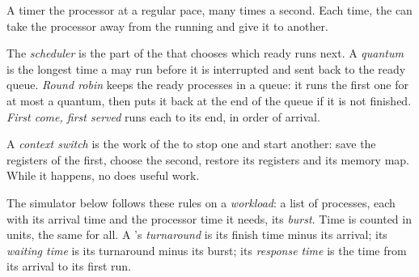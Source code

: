 A timer  the processor at a regular pace, many times a second. Each time, the  can take the processor away from the running  and give it to another.

\begin{definition}\label{def:g12:processes-and-scheduling:scheduler}
The \emph{scheduler} is the part of the  that chooses which ready  runs next. A
\emph{quantum} is the longest time a  may run before it is interrupted and sent back to the
ready queue. \emph{Round robin} keeps the ready processes in a queue: it runs the first one for at
most a quantum, then puts it back at the end of the queue if it is not finished. \emph{First come, first served} runs
each  to its end, in order of arrival.
\end{definition}

\begin{definition}\label{def:g12:processes-and-scheduling:context-switch}
A \emph{context switch} is the work of the  to stop one  and start another: save
the registers of the first, choose the second, restore its registers and its memory map. While it happens, no 
does useful work.
\end{definition}

The simulator below follows these rules on a \emph{workload}: a list of processes, each with its arrival time and
the processor time it needs, its \emph{burst}. Time is counted in units, the same for all. A 's
\emph{turnaround} is its finish time minus its arrival; its \emph{waiting time} is its turnaround minus its burst; its
\emph{response time} is the time from its arrival to its first run.

\label{lst:g12:processes-and-scheduling:scheduler}

